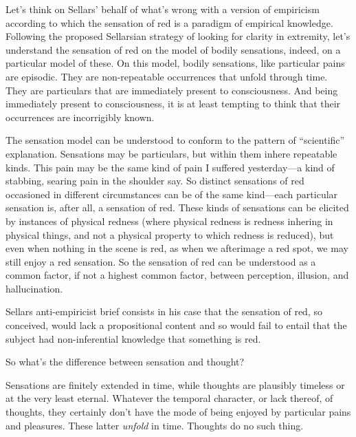 \documentclass[11pt]{article}
\begin{document}
Let's think on Sellars' behalf of what's wrong with a version of empiricism according to which the sensation of red is a paradigm of empirical knowledge. Following the proposed Sellarsian strategy of looking for clarity in extremity, let's understand the sensation of red on the model of bodily sensations, indeed, on a particular model of these. On this model, bodily sensations, like particular pains are episodic. They are non-repeatable occurrences that unfold through time. They are particulars that are immediately present to consciousness. And being immediately present to consciousness, it is at least tempting to think that their occurrences are incorrigibly known.

The sensation model can be understood to conform to the pattern of ``scientific'' explanation. Sensations may be particulars, but within them inhere repeatable kinds. This pain may be the same kind of pain I suffered yesterday---a kind of stabbing, searing pain in the shoulder say. So distinct sensations of red occasioned in different circumstances can be of the same kind---each particular sensation is, after all, a sensation of red. These kinds of sensations can be elicited by instances of physical redness (where physical redness is redness inhering in physical things, and not a physical property to which redness is reduced), but even when nothing in the scene is red, as when we afterimage a red spot, we may still enjoy a red sensation. So the sensation of red can be understood as a common factor, if not a highest common factor, between perception, illusion, and hallucination.

Sellars anti-empiricist brief consists in his case that the sensation of red, so conceived, would lack a propositional content and so would fail to entail that the subject had non-inferential knowledge that something is red.

So what's the difference between sensation and thought?

Sensations are finitely extended in time, while thoughts are plausibly timeless or at the very least eternal. Whatever the temporal character, or lack thereof, of thoughts, they certainly don't have the mode of being enjoyed by particular pains and pleasures. These latter \emph{unfold} in time. Thoughts do no such thing.
\end{document}
